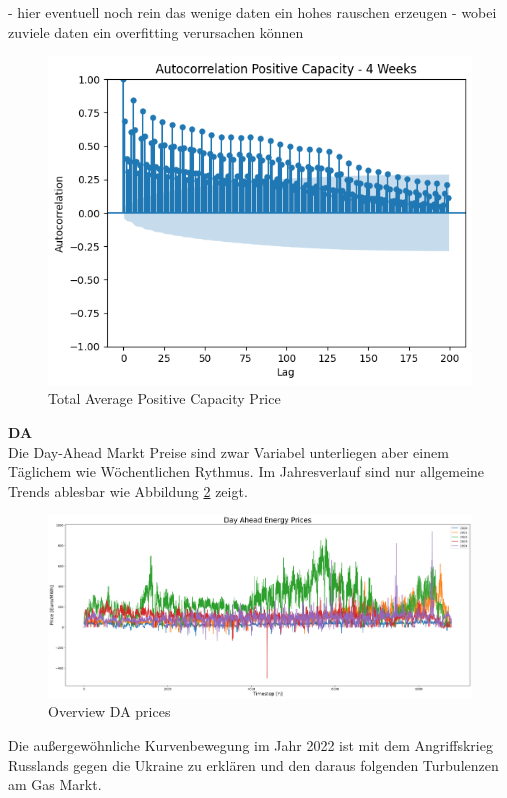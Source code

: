 - hier eventuell noch rein das wenige daten ein hohes rauschen erzeugen
- wobei zuviele daten ein overfitting verursachen können


\begin{figure}[!h]
	\includegraphics[width=1\linewidth]{pictures/autocorrelation_posCap_4weeks.png}
	\caption{Total Average Positive Capacity Price}
	\label{fig:Autocorrelation Positive Capacity  Price}
\end{figure}


\textbf{DA}\\
Die Day-Ahead Markt Preise sind zwar Variabel unterliegen aber einem Täglichem wie Wöchentlichen Rythmus.
Im Jahresverlauf sind nur allgemeine Trends ablesbar wie Abbildung \ref{fig:overviewDAprices} zeigt.
\begin{figure}[!h]
	\includegraphics[width=1\linewidth]{pictures/overviewDAprices_year.png}
	\caption{Overview DA prices}
	\label{fig:overviewDAprices}
\end{figure}
Die außergewöhnliche Kurvenbewegung im Jahr 2022 ist mit dem Angriffskrieg Russlands gegen die Ukraine zu erklären
und den daraus folgenden Turbulenzen am Gas Markt.

